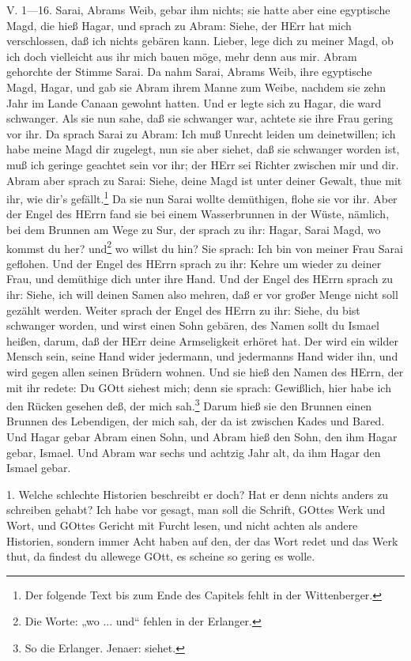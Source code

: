 \begin{schriftzitat}
V. 1—16. Sarai, Abrams Weib, gebar ihm nichts; sie hatte aber eine egyptische Magd, die hieß Hagar, und sprach zu Abram: Siehe, der HErr hat mich verschlossen, daß ich nichts gebären kann. Lieber, lege dich zu meiner Magd, ob ich doch vielleicht aus ihr mich bauen möge, mehr denn aus mir. Abram gehorchte der Stimme Sarai. Da nahm Sarai, Abrams Weib, ihre egyptische Magd, Hagar, und gab sie Abram ihrem Manne zum Weibe, nachdem sie zehn Jahr im Lande Canaan gewohnt hatten. Und er legte sich zu Hagar, die ward schwanger. Als sie nun sahe, daß sie schwanger war, achtete sie ihre Frau gering vor ihr. Da sprach Sarai zu Abram: Ich muß Unrecht leiden um deinetwillen; ich habe meine Magd dir zugelegt, nun sie aber siehet, daß sie schwanger worden ist, muß ich geringe geachtet sein vor ihr; der HErr sei Richter zwischen mir und dir. Abram aber sprach zu Sarai: Siehe, deine Magd ist unter deiner Gewalt, thue mit ihr, wie dir’s gefällt.\footnote{Der folgende Text bis zum Ende des Capitels fehlt in der Wittenberger.} Da sie nun Sarai wollte demüthigen, flohe sie vor ihr. Aber der Engel des HErrn fand sie bei einem Wasserbrunnen in der Wüste, nämlich, bei dem Brunnen am Wege zu Sur, der sprach zu ihr: Hagar, Sarai Magd, wo kommst du her? und\footnote{Die Worte: „wo ... und“ fehlen in der Erlanger.} wo willst du hin? Sie sprach: Ich bin von meiner Frau Sarai geflohen. Und der Engel des HErrn sprach zu ihr: Kehre um wieder zu deiner Frau, und demüthige dich unter ihre Hand. Und der Engel des HErrn sprach zu ihr: Siehe, ich will deinen Samen also mehren, daß er vor großer Menge nicht soll gezählt werden. Weiter sprach der Engel des HErrn zu ihr: Siehe, du bist schwanger worden, und wirst einen Sohn gebären, des Namen sollt du Ismael heißen, darum, daß der HErr deine Armseligkeit erhöret hat. Der wird ein wilder Mensch sein, seine Hand wider jedermann, und jedermanns Hand wider ihn, und wird gegen allen seinen Brüdern wohnen. Und sie hieß den Namen des HErrn, der mit ihr redete: Du GOtt siehest mich; denn sie sprach: Gewißlich, hier habe ich den Rücken gesehen deß, der mich sah.\footnote{So die Erlanger. Jenaer: siehet.} Darum hieß sie den Brunnen einen Brunnen des Lebendigen, der mich sah, der da ist zwischen Kades und Bared. Und Hagar gebar Abram einen Sohn, und Abram hieß den Sohn, den ihm Hagar gebar, Ismael. Und Abram war sechs und achtzig Jahr alt, da ihm Hagar den Ismael gebar.
\end{schriftzitat}

1. Welche schlechte Historien beschreibt er doch? Hat er denn nichts anders zu schreiben gehabt? Ich habe vor gesagt, man soll die Schrift, GOttes Werk und Wort, und GOttes Gericht mit Furcht lesen, und nicht achten als andere Historien, sondern immer Acht haben auf den, der das Wort redet und das Werk thut, da findest du allewege GOtt, es scheine so gering es wolle.

